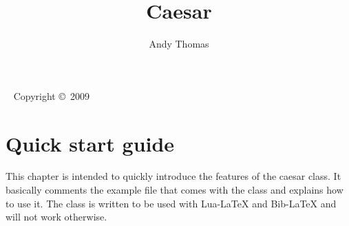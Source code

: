 \documentclass[]{caesar_book}
\title{Caesar}
\author{Andy Thomas}
\newcommand{\publisher}{Bielefeld University}
\begin{document}
\frontmatter
\maketitlepage
\newpage
\begin{fullwidth}
~\vfill
\thispagestyle{empty} 
\setlength{\parindent}{0pt}
\setlength{\parskip}{\baselineskip}
\makeatletter
Copyright \copyright\ 2009 \@author
\makeatother
\end{fullwidth}
\newpage

\tableofcontents

\cleardoublepage
%
\mainmatter
\chapter{Quick start guide}
This chapter is intended to quickly introduce the features of the caesar class. It basically comments the example file that comes with the class and explains how to use it. The class is written to be used with Lua-\LaTeX{} and Bib-\LaTeX{} and will not work otherwise. 
\end{document}
